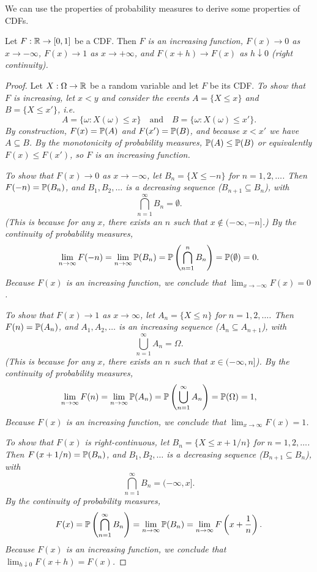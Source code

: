 We can use the properties of probability measures to derive some properties of CDFs. 

\begin{theorem}\label{thm:props_cdfs}
Let $F:\mathbb{R}\to[0,1]$ be a CDF. Then
\ben
\it $F$ is an increasing function, 
\it $F(x)\to 0$ as $x\to-\infty$,
\it $F(x)\to 1$ as $x\to+\infty$, and
\it $F(x+h)\to F(x)$ as $h\downarrow 0$ (right continuity).
\een
\end{theorem}


\begin{proof}
Let $X:\Omega\to\mathbb{R}$ be a random variable and let $F$ be its CDF.
\ben
\it %
To show that $F$ is increasing, let $x < y$ and consider the events $A = \{X\leq x\}$ and $B = \{X\leq x'\}$, i.e.
\[
A	= \{\omega: X(\omega)\leq x\}
\quad\text{and}\quad
B	= \{\omega: X(\omega)\leq x'\}.
\]
By construction, $F(x)=\mathbb{P}(A)$ and $F(x')=\mathbb{P}(B)$, and because $x < x'$ we have $A\subseteq B$. By the monotonicity of probability measures, $\mathbb{P}(A)\leq \mathbb{P}(B)$ or equivalently $F(x) \leq F(x')$, so $F$ is an increasing function.

\it %
To show that $F(x)\to 0$ as $x\to-\infty$, let $B_n = \{X\leq -n\}$ for $n=1,2,\ldots$. Then $F(-n)= \mathbb{P}(B_n)$, and $B_1,B_2,\ldots$ is a decreasing sequence ($B_{n+1}\subseteq B_n$), with 
\[
\bigcap_{n=1}^{\infty} B_n = \emptyset.
\]
(This is because for any $x$, there exists an $n$ such that $x\notin (-\infty,-n]$.) By the continuity of probability measures,
\[
\lim_{n\to\infty}F(-n) = \lim_{n\to\infty}\mathbb{P}(B_n) = \mathbb{P}\left(\bigcap_{n=1}^n B_n\right) = \mathbb{P}(\emptyset) = 0.
\]
Because $F(x)$ is an increasing function, we conclude that $\lim_{x\to-\infty}F(x)=0$.


\it %
To show that $F(x)\to 1$ as $x\to\infty$, let $A_n = \{X\leq n\}$ for $n=1,2,\ldots$. Then $F(n)= \mathbb{P}(A_n)$, and $A_1,A_2,\ldots$ is an increasing sequence ($A_n\subseteq A_{n+1}$), with 
\[
\bigcup_{n=1}^{\infty} A_n = \Omega.
\]
(This is because for any $x$, there exists an $n$ such that $x\in (-\infty,n]$).  By the continuity of probability measures,
\[
\lim_{n\to\infty}F(n) = \lim_{n\to\infty}\mathbb{P}(A_n) = \mathbb{P}\left(\bigcup_{n=1}^{\infty} A_n\right) = \mathbb{P}(\Omega) = 1,
\]
Because $F(x)$ is an increasing function, we conclude that $\lim_{x\to\infty}F(x)=1$.

\it %
To show that $F(x)$ is right-continuous, let $B_n = \{X\leq x+1/n\}$ for $n=1,2,\ldots$. Then $F\left(x+1/n\right) = \mathbb{P}(B_n)$, and $B_1,B_2,\ldots$ is a decreasing sequence ($B_{n+1}\subseteq B_n$), with \[
\bigcap_{n=1}^{\infty} B_n = (-\infty,x]. 
\]
By the continuity of probability measures,
\[
F(x) = \mathbb{P}\left(\bigcap_{n=1}^{\infty} B_n\right) = \lim_{n\to\infty} \mathbb{P}(B_n) = \lim_{n\to\infty}F\left(x+\frac{1}{n}\right).
\]
Because $F(x)$ is an increasing function, we conclude that $\lim_{h\downarrow 0}F(x+h)=F(x)$.
\een
\end{proof}

